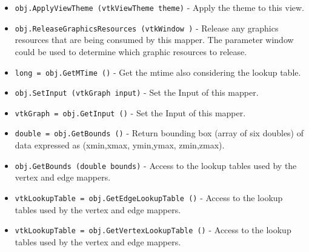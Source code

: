 \begin{itemize}
\item  \verb|obj.ApplyViewTheme (vtkViewTheme theme)| -  Apply the theme to this view.

\item  \verb|obj.ReleaseGraphicsResources (vtkWindow )| -  Release any graphics resources that are being consumed by this mapper.
 The parameter window could be used to determine which graphic
 resources to release.

\item  \verb|long = obj.GetMTime ()| -  Get the mtime also considering the lookup table.

\item  \verb|obj.SetInput (vtkGraph input)| -  Set the Input of this mapper.

\item  \verb|vtkGraph = obj.GetInput ()| -  Set the Input of this mapper.

\item  \verb|double = obj.GetBounds ()| -  Return bounding box (array of six doubles) of data expressed as
 (xmin,xmax, ymin,ymax, zmin,zmax).

\item  \verb|obj.GetBounds (double bounds)| -  Access to the lookup tables used by the vertex and edge mappers.

\item  \verb|vtkLookupTable = obj.GetEdgeLookupTable ()| -  Access to the lookup tables used by the vertex and edge mappers.

\item  \verb|vtkLookupTable = obj.GetVertexLookupTable ()| -  Access to the lookup tables used by the vertex and edge mappers.

\end{itemize}
